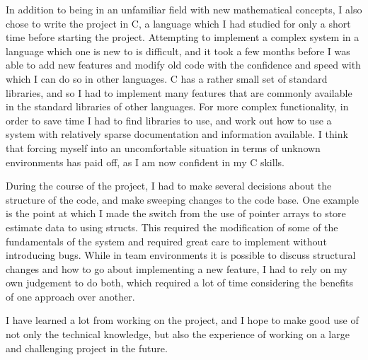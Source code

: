 \documentclass[a4paper,11pt]{article}
\begin{document}
   In addition to being in an unfamiliar field with new mathematical concepts, I
   also chose to write the project in C, a language which I had studied for only
   a short time before starting the project. Attempting to implement a complex
   system in a language which one is new to is difficult, and it took a few
   months before I was able to add new features and modify old code with the
   confidence and speed with which I can do so in other languages. C has a
   rather small set of standard libraries, and so I had to implement many
   features that are commonly available in the standard libraries of other
   languages. For more complex functionality, in order to save time I had to
   find libraries to use, and work out how to use a system with relatively
   sparse documentation and information available. I think that forcing myself
   into an uncomfortable situation in terms of unknown environments has paid
   off, as I am now confident in my C skills.

   During the course of the project, I had to make several decisions about the
   structure of the code, and make sweeping changes to the code base. One
   example is the point at which I made the switch from the use of pointer
   arrays to store estimate data to using structs. This required the
   modification of some of the fundamentals of the system and required great
   care to implement without introducing bugs. While in team environments it is
   possible to discuss structural changes and how to go about implementing a new
   feature, I had to rely on my own judgement to do both, which required a lot
   of time considering the benefits of one approach over another.

   I have learned a lot from working on the project, and I hope to make good use
   of not only the technical knowledge, but also the experience of working on a
   large and challenging project in the future.
\end{document}
